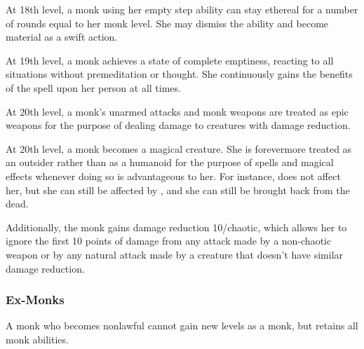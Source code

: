  At 18th level, a monk using her empty step ability can stay ethereal for a number of rounds equal to her monk level. She may dismiss the ability and become material as a swift action.

 At 19th level, a monk achieves a state of complete emptiness, reacting to all situations without premeditation or thought. She continuously gains the benefits of the  spell upon her person at all times.

 At 20th level, a monk's unarmed attacks and monk weapons are treated as epic weapons for the purpose of dealing damage to creatures with damage reduction.

 At 20th level, a monk becomes a magical creature. She is forevermore treated as an outsider rather than as a humanoid for the purpose of spells and magical effects   whenever doing so is advantageous to her. For instance,  does not affect her, but she can still be affected by , and she can still be brought back from the dead.

Additionally, the monk gains damage reduction 10/chaotic, which allows her to ignore the first 10 points of damage from any attack made by a non-chaotic weapon or by any natural attack made by a creature that doesn't have similar damage reduction.

\subsubsection{Ex-Monks}
A monk who becomes nonlawful cannot gain new levels as a monk, but retains all monk abilities.

